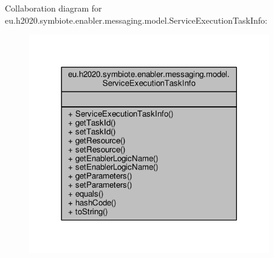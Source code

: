 Collaboration diagram for eu.\+h2020.\+symbiote.\+enabler.\+messaging.\+model.\+Service\+Execution\+Task\+Info\+:
\nopagebreak
\begin{figure}[H]
\begin{center}
\leavevmode
\includegraphics[width=296pt]{classeu_1_1h2020_1_1symbiote_1_1enabler_1_1messaging_1_1model_1_1ServiceExecutionTaskInfo__coll__graph}
\end{center}
\end{figure}
